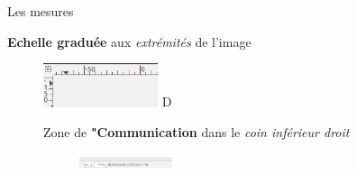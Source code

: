 \documentclass[10pt,svgnames,usenames,table]{beamer}
\begin{document}
\begin{frame}[allowframebreaks]{Les mesures}
\begin{itemize}
	\item \textbf{Echelle graduée} aux \textit{extrémités} de l'image
	
	\begin{figure}
        	\centering
        	\includegraphics[width=0.3\textwidth]{Images/Scale.png} 
D
	\vspace{0.3cm}	
	
	\item Zone de \textbf{"Communication} dans le \textit{coin inférieur droit}

	\begin{figure}
        	\centering
        	\includegraphics[width=0.3\textwidth]{Images/commu.png} 
	\end{figure}
	

\end{figure}
\end{itemize}
\end{frame}
\end{document}
